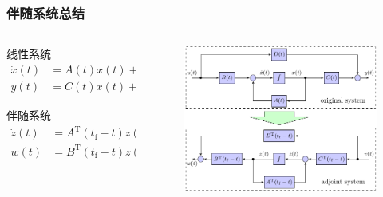 \documentclass[12pt,xcolor={table},aspectratio=169]{beamer}
\begin{document}
\begin{frame}
    \frametitle{伴随系统总结}
        \vspace{0em}
    \begin{columns}
    \begin{column}[c]{0.4\paperwidth}
  \begin{block}{线性系统}
  {\setlength\abovedisplayskip{1pt}
  \setlength\belowdisplayskip{1pt}
\begin{equation*}
\left .
 \begin{aligned}
        \dot{x}(t) &= A(t)x(t)+B(t)u(t), \\
        y(t) & = C(t)x(t)+D(t)u(t)
 \end{aligned} \right \}
\end{equation*}
   }%
  \end{block}
    \begin{block}{伴随系统}
  {\setlength\abovedisplayskip{1pt}
  \setlength\belowdisplayskip{1pt}
\begin{equation*}
\left .
  \begin{aligned}
        \dot{z}(t) &= A^{\mathrm{T}}(t_{\mathrm{f}}-t)z(t)+C^{\mathrm{T}}(t_{\mathrm{f}}-t)v(t),  \\
        w(t) & = B^{\mathrm{T}}(t_{\mathrm{f}}-t)z(t)+D^{\mathrm{T}}(t_{\mathrm{f}}-t)v(t)
 \end{aligned} \right \}
\end{equation*}
  }%
  \end{block}
  \end{column}
      \begin{column}[c]{0.4\paperwidth}
      \vspace{0.5em}
        \begin{minipage}[c][0.6\textheight][c]{\linewidth}
    \centering
\begin{figure}
    \centering
\includegraphics[scale=0.6]{image/adjCnstr}

\end{figure}
\end{minipage}
\end{column}
\end{columns}
\end{frame}
\end{document}
